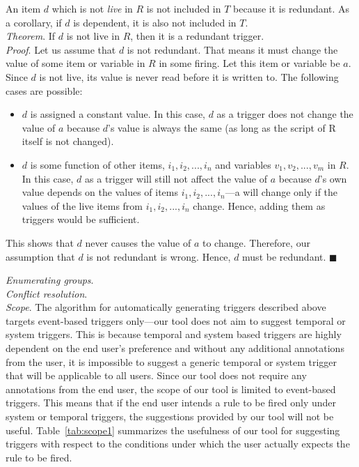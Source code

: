 \documentclass{sig-alternate-05-2015}
\begin{document}
\begin{enumerate}
An item $d$ which is not \textit{live} in $R$ is not included in $T$ because it is redundant. As a corollary, if $d$ is dependent, it is also not included in $T$.\\
\emph{Theorem}. If $d$ is not live in $R$, then it is a redundant trigger.\\
\emph{Proof}. Let us assume that $d$ is not redundant. That means it must change the value of some item or variable in $R$ in some firing. Let this item or variable be $a$. Since $d$ is not live, its value is never read before it is written to. The following cases are possible:
\begin{itemize} [topsep=-2pt, itemsep=-1pt]
\item $d$ is assigned a constant value. In this case, $d$ as a trigger does not change the value of $a$ because $d$'s value is always the same (as long as the script of R  itself is not changed).
\item $d$ is some function of other items, $i_1, i_2, ..., i_n$ and variables $v_1, v_2, ..., v_m$ in $R$. In this case, $d$ as a trigger will still not affect the value of $a$ because $d$'s own value depends on the values of items $i_1, i_2, ..., i_n$---a will change only if the values of the live items from $i_1, i_2, ..., i_n$ change. Hence, adding them as triggers would be sufficient.
\end{itemize}
This shows that $d$ never causes the value of $a$ to change. Therefore, our assumption that $d$ is not redundant is wrong. Hence, $d$ must be redundant. $\blacksquare$
\end{enumerate}
\emph{Enumerating groups}.\\
\emph{Conflict resolution}.\\
\emph{Scope}. The algorithm for automatically generating triggers described above targets event-based triggers only---our tool does not aim to suggest temporal or system triggers. This is because temporal and system based triggers are highly dependent on the end user's preference and without any additional annotations from the user, it is impossible to suggest a generic temporal or system trigger that will be applicable to all users. Since our tool does not require any annotations from the end user, the scope of our tool is limited to event-based triggers. This means that if the end user intends a rule to be fired only under system or temporal triggers, the suggestions provided by our tool will not be useful. Table~\ref{tab:scope1} summarizes the usefulness of our tool for suggesting triggers with respect to the conditions under which the user actually expects the rule to be fired.
\end{document}
